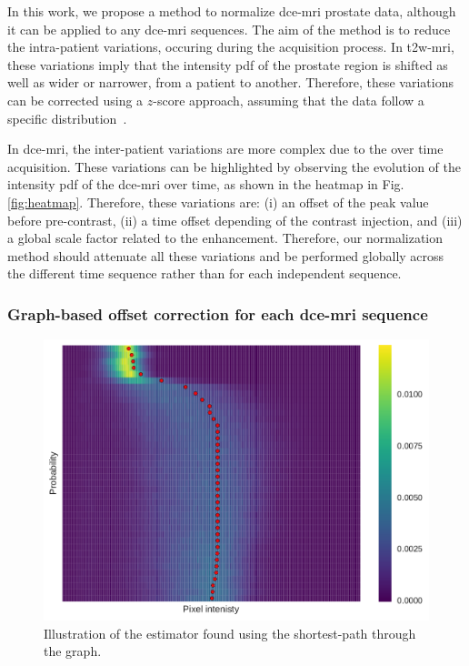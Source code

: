 In this work, we propose a method to normalize \ac{dce}-\ac{mri} prostate data, although it can be applied to any \ac{dce}-\ac{mri} sequences.
The aim of the method is to reduce the intra-patient variations, occuring during the acquisition process.
In \ac{t2w}-\ac{mri}, these variations imply that the intensity \ac{pdf} of the prostate region is shifted as well as wider or narrower, from a patient to another.
Therefore, these variations can be corrected using a $z$-score approach, assuming that the data follow a specific distribution~\citep{lemaitre2016normalization}.

In \ac{dce}-\ac{mri}, the inter-patient variations are more complex due to the over time acquisition.
These variations can be highlighted by observing the evolution of the intensity \ac{pdf} of the \ac{dce}-\ac{mri} over time, as shown in the heatmap in Fig.\,\ref{fig:heatmap}.
Therefore, these variations are:
(i) an offset of the peak value before pre-contrast,
(ii) a time offset depending of the contrast injection, and
(iii) a global scale factor related to the enhancement.
Therefore, our normalization method should attenuate all these variations and be performed globally across the different time sequence rather than for each independent sequence.

\subsubsection{Graph-based offset correction for each \ac{dce}-\ac{mri} sequence}

\begin{figure}
  \centering
  \includegraphics[width=0.7\linewidth]{02_methods/figures/estimator.pdf}
  \caption{Illustration of the estimator found using the shortest-path through the graph.}
  \label{fig:estimator}
\end{figure}

